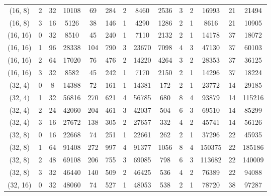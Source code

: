 \begin{tabular}{|c|c||c|c|c|c|c|c|c|c||c|c|c|c|}
  (16, 8) &          2 &  32 &   10108 &  69 &   284 & 2 &    8460 &  2536 &  3 &                 2 &   16993 &     21 &       21494 \\
  (16, 8) &          3 &  16 &    5126 &  38 &   146 & 1 &    4290 &  1286 &  2 &                 1 &    8616 &     21 &       10905 \\
 (16, 16) &          0 &  32 &    8510 &  45 &   240 & 1 &    7110 &  2132 &  2 &                 1 &   14178 &     37 &       18072 \\
 (16, 16) &          1 &  96 &   28338 & 104 &   790 & 3 &   23670 &  7098 &  4 &                 3 &   47130 &     37 &       60103 \\
 (16, 16) &          2 &  64 &   17020 &  76 &   476 & 2 &   14220 &  4264 &  3 &                 2 &   28353 &     37 &       36125 \\
 (16, 16) &          3 &  32 &    8582 &  45 &   242 & 1 &    7170 &  2150 &  2 &                 1 &   14296 &     37 &       18224 \\
  (32, 4) &          0 &   8 &   14388 &  72 &   161 & 1 &   14381 &   172 &  2 &                 1 &   23772 &     14 &       29185 \\
  (32, 4) &          1 &  32 &   56816 & 270 &   621 & 4 &   56785 &   680 &  8 &                 4 &   93879 &     14 &      115216 \\
  (32, 4) &          2 &  24 &   42060 & 204 &   461 & 3 &   42037 &   504 &  6 &                 3 &   69510 &     14 &       85299 \\
  (32, 4) &          3 &  16 &   27672 & 138 &   305 & 2 &   27657 &   332 &  4 &                 2 &   45741 &     14 &       56126 \\
  (32, 8) &          0 &  16 &   22668 &  74 &   251 & 1 &   22661 &   262 &  2 &                 1 &   37296 &     22 &       45935 \\
  (32, 8) &          1 &  64 &   91408 & 272 &   997 & 4 &   91377 &  1056 &  8 &                 4 &  150375 &     22 &      185186 \\
  (32, 8) &          2 &  48 &   69108 & 206 &   755 & 3 &   69085 &   798 &  6 &                 3 &  113682 &     22 &      140009 \\
  (32, 8) &          3 &  32 &   46440 & 140 &   509 & 2 &   46425 &   536 &  4 &                 2 &   76389 &     22 &       94088 \\
 (32, 16) &          0 &  32 &   48060 &  74 &   527 & 1 &   48053 &   538 &  2 &                 1 &   78720 &     38 &       97287 \\

\end{tabular}
